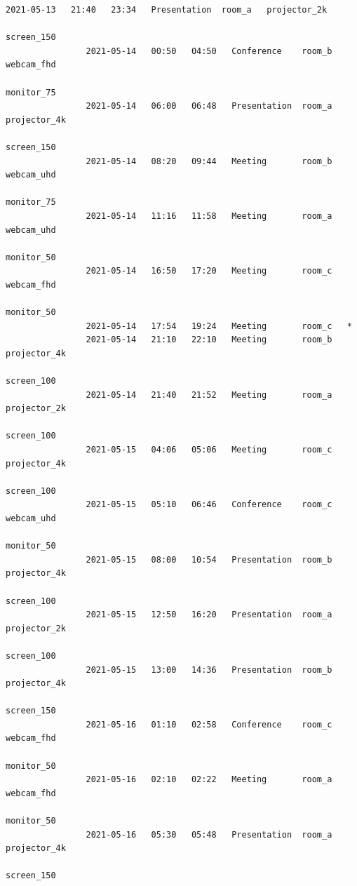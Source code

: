 \documentclass{article}
\begin{document}
\begin{Verbatim}[gobble=8]
                2021-05-13   21:40   23:34   Presentation  room_a   projector_2k
                                                                    screen_150
                2021-05-14   00:50   04:50   Conference    room_b   webcam_fhd
                                                                    monitor_75
                2021-05-14   06:00   06:48   Presentation  room_a   projector_4k
                                                                    screen_150
                2021-05-14   08:20   09:44   Meeting       room_b   webcam_uhd
                                                                    monitor_75
                2021-05-14   11:16   11:58   Meeting       room_a   webcam_uhd
                                                                    monitor_50
                2021-05-14   16:50   17:20   Meeting       room_c   webcam_fhd
                                                                    monitor_50
                2021-05-14   17:54   19:24   Meeting       room_c   *
                2021-05-14   21:10   22:10   Meeting       room_b   projector_4k
                                                                    screen_100
                2021-05-14   21:40   21:52   Meeting       room_a   projector_2k
                                                                    screen_100
                2021-05-15   04:06   05:06   Meeting       room_c   projector_4k
                                                                    screen_100
                2021-05-15   05:10   06:46   Conference    room_c   webcam_uhd
                                                                    monitor_50
                2021-05-15   08:00   10:54   Presentation  room_b   projector_4k
                                                                    screen_100
                2021-05-15   12:50   16:20   Presentation  room_a   projector_2k
                                                                    screen_100
                2021-05-15   13:00   14:36   Presentation  room_b   projector_4k
                                                                    screen_150
                2021-05-16   01:10   02:58   Conference    room_c   webcam_fhd
                                                                    monitor_50
                2021-05-16   02:10   02:22   Meeting       room_a   webcam_fhd
                                                                    monitor_50
                2021-05-16   05:30   05:48   Presentation  room_a   projector_4k
                                                                    screen_150

\end{Verbatim}
\end{document}
